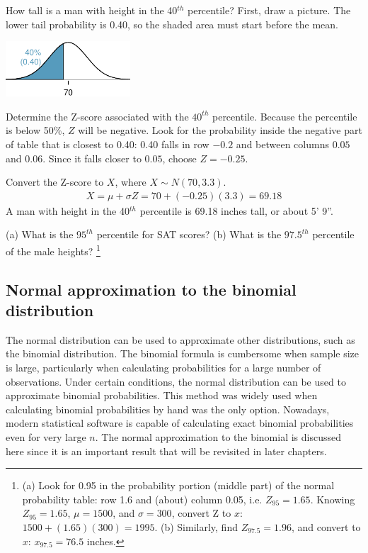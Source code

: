 \begin{example}{How tall is a man with height in the 40$^{th}$ percentile?}\label{normalExam40Perc}
First, draw a picture. The lower tail probability is 0.40, so the shaded area must start before the mean. \vspace{-1mm}
\begin{center}
\includegraphics[width=0.35\textwidth]{ch_distributions_oi_biostat/figures/height40Perc/height40Perc}\vspace{-1mm}
\end{center}

Determine the Z-score associated with the $40^{th}$ percentile. Because the percentile is below 50\%, $Z$ will be negative. Look for the probability inside the negative part of table that is closest to 0.40: 0.40 falls in row $-0.2$ and between columns $0.05$ and $0.06$. Since it falls closer to $0.05$, choose $Z=-0.25$.

Convert the Z-score to $X$, where $X \sim N(70, 3.3)$. 
\begin{align*}
X = \mu + \sigma Z = 70 + (-0.25)(3.3) = 69.18
\end{align*}
A man with height in the 40$^{th}$ percentile is 69.18 inches tall, or about 5' 9''. 
\end{example}

\begin{exercise}
(a) What is the $95^{th}$ percentile for SAT scores? (b) What is the $97.5^{th}$ percentile of the male heights? \footnote{(a) Look for 0.95 in the probability portion (middle part) of the normal probability table: row 1.6 and (about) column 0.05, i.e. $Z_{95}=1.65$. Knowing $Z_{95}=1.65$, $\mu = 1500$, and $\sigma = 300$, convert Z to $x$: $1500 + (1.65)(300) = 1995$. (b) Similarly, find $Z_{97.5} = 1.96$, and convert to $x$: $x_{97.5} = 76.5$ inches.}
\end{exercise}


\subsection{Normal approximation to the binomial distribution}
	

The normal distribution can be used to approximate other distributions, such as the binomial distribution. The binomial formula is cumbersome when sample size is large, particularly when calculating probabilities for a large number of observations. Under certain conditions, the normal distribution can be used to approximate binomial probabilities. This method was widely used when calculating binomial probabilities by hand was the only option. Nowadays, modern statistical software is capable of calculating exact binomial probabilities even for very large $n$. The normal approximation to the binomial is discussed here since it is an important result that will be revisited in later chapters.

